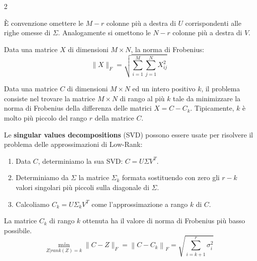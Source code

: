 \documentclass[\main/main.tex]{subfiles}
\begin{document}
\begin{multicols}{2}
\begin{definition}
    È convenzione omettere le \(M-r\) colonne più a destra di \(U\) corrispondenti alle righe omesse di \(\Sigma\). Analogamente si omettono le \(N - r\) colonne più a destra di \(V\).
\end{definition}
\begin{definition}
    Data una matrice \(X\) di dimensioni \(M \times N\), la norma di Frobenius:
    \[
        \|X\|_{F}=\sqrt{\sum_{i=1}^{M} \sum_{j=1}^{N} X_{i j}^{2}}
    \]
\end{definition}
\begin{problem}
    Data una matrice \(C\) di dimensioni \(M \times N\) ed un intero positivo \(k\), il problema consiste nel trovare la matrice \(M \times N\) di rango al più \(k\) tale da minimizzare la norma di Frobenius della differenza delle matrici \(X = C - C_k\). Tipicamente, \(k\) è molto più piccolo del rango \(r\) della matrice \(C\).
\end{problem}
\begin{analysis}
    Le \textbf{singular values decompositions} (SVD) possono essere usate per risolvere il problema delle approssimazioni di Low-Rank:
    \begin{enumerate}
        \item Data \(C\), determiniamo la sua SVD: \(C=U\Sigma V^T\).
        \item Determiniamo da \(\Sigma\) la matrice \(\Sigma_k\) formata sostituendo con zero gli \(r-k\) valori singolari più piccoli sulla diagonale di \(\Sigma\).
        \item Calcoliamo \(C_k = U \Sigma_k V^T\) come l'approssimazione a rango \(k\) di \(C\).
    \end{enumerate}
\end{analysis}
\begin{theorem}
    La matrice \(C_k\) di rango \(k\) ottenuta ha il valore di norma di Frobenius più basso possibile.
    \[
        \min _{Z | r a n k(Z)=k}\|C-Z\|_{F}=\left\|C-C_{k}\right\|_{F}=\sqrt{\sum_{i=k+1}^{r} \sigma_{i}^{2}}
    \]
\end{theorem}
\end{multicols}
\end{document}
